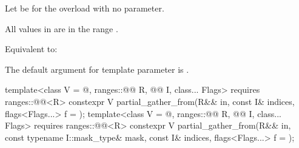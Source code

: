 \begin{itemdescr}
\pnum
Let  be  for the overload with
no  parameter.

\pnum
\expects
All values in  are in
the range .

\pnum
\effects
Equivalent to: 

\pnum
\remarks
The default argument for template parameter  is
.
\end{itemdescr}

\begin{itemdecl}
template<class V = @\seebelow@, ranges::@@ R, @@ I, class... Flags>
  requires ranges::@@<R>
  constexpr V partial_gather_from(R&& in, const I& indices, flags<Flags...> f = {});
template<class V = @\seebelow@, ranges::@@ R, @@ I, class... Flags>
  requires ranges::@@<R>
  constexpr V partial_gather_from(R&& in, const typename I::mask_type& mask,
                                  const I& indices, flags<Flags...> f = {});
\end{itemdecl}

